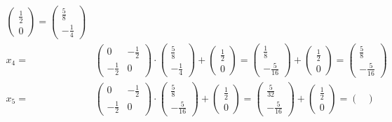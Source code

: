 \documentclass[a4paper,10pt]{article}
\begin{document}
\begin{enumerate}[a)]
\begin{align*}
\begin{pmatrix}
			\frac{1}{2}\\
			0
			\end{pmatrix}
			=
			\begin{pmatrix}
			\frac{5}{8}\\[2pt]
			-\frac{1}{4}
			\end{pmatrix}\\
			x_4 = &
			\begin{pmatrix}
			0 & -\frac{1}{2}\\[2pt]
			-\frac{1}{2} & 0
			\end{pmatrix} 
			\cdot
			\begin{pmatrix}
			\frac{5}{8}\\[2pt]
			-\frac{1}{4}
			\end{pmatrix}
			+
			\begin{pmatrix}
			\frac{1}{2}\\
			0
			\end{pmatrix}
			=
			\begin{pmatrix}
			\frac{1}{8}\\[2pt]
			-\frac{5}{16}
			\end{pmatrix}
			+
			\begin{pmatrix}
			\frac{1}{2}\\
			0
			\end{pmatrix}
			=
			\begin{pmatrix}
			\frac{5}{8}\\[2pt]
			-\frac{5}{16}
			\end{pmatrix}\\
			x_5 = &
			\begin{pmatrix}
			0 & -\frac{1}{2}\\[2pt]
			-\frac{1}{2} & 0
			\end{pmatrix} 
			\cdot
			\begin{pmatrix}
			\frac{5}{8}\\[2pt]
			-\frac{5}{16}
			\end{pmatrix}
			+
			\begin{pmatrix}
			\frac{1}{2}\\
			0
			\end{pmatrix}
			=
			\begin{pmatrix}
			\frac{5}{32}\\[2pt]
			-\frac{5}{16}
			\end{pmatrix}
			+
			\begin{pmatrix}
			\frac{1}{2}\\
			0
			\end{pmatrix}
			=
			\begin{pmatrix}

\end{pmatrix}
\end{align*}
\end{enumerate}
\end{document}
